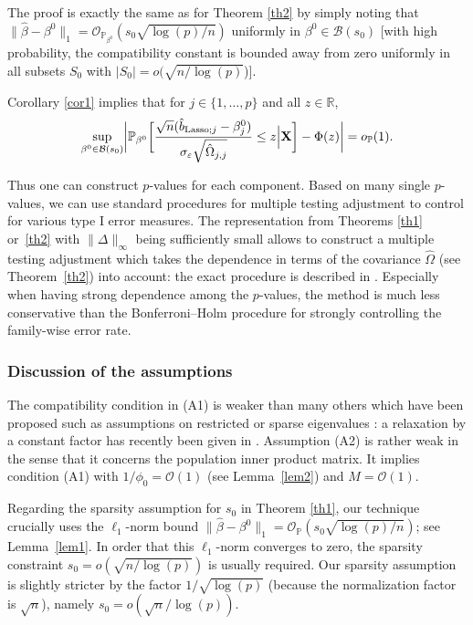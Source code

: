 \documentclass[aos,MSNbibl,dvips]{arximspdf}
\newcommand{\rrvert}{\vert}
\newcommand{\llvert}{\vert}
\def\cal{\mathcal}
\newcommand{\PP}{\mathbb{P}}
\newcommand{\R}{\mathbb{R}}
\newcommand{\eps}{\varepsilon}
\newcommand{\bx}{\mathbf{X}}
\begin{document}
The proof is exactly the same as for Theorem \ref{th2} by simply noting
that $ \|\hat{\beta} - \beta^0\|_1 =
{\mathcal O}_{\PP_{\beta^0} }(s_{0} \sqrt{\log(p)/n})$ uniformly in
$\beta^0 \in{\cal B} (s_0)$ [with high probability, the compatibility
constant is bounded away from zero uniformly in all subsets $S_0$ with
$|S_0 | =o(\sqrt{n /\log(p)}$)].

Corollary \ref{cor1} implies that for $j \in\{1,\ldots,p\}$ and all
$z \in\R$,
%
\[
\sup_{\beta^0 \in{\cal B}(s_0 )}\biggl\llvert \PP_{\beta^0} \biggl[
{
\sqrt
{n}(\hat{b}_{\mathrm{Lasso};j} -
\beta_{j}^0) \over\sigma_{\eps} \sqrt{\hat\Omega_{j,j}}} \le z \Big|\bx \biggr] - \Phi(z) \biggr\rrvert =
o_{\PP} (1).
\]
%

Thus one can construct $p$-values for each component.
Based on many single $p$-values, we can use standard procedures for multiple
testing adjustment to control for various type I error measures. The
representation from Theorems \ref{th1} or~\ref{th2} with
$\|\Delta\|_{\infty}$ being sufficiently small allows to construct a
multiple testing adjustment which takes the dependence in terms of the
covariance $\hat\Omega$ (see Theorem~\ref{th2}) into account: the exact
procedure is described in \cite{pb12}. Especially when having strong
dependence among the $p$-values, the method is much less conservative than
the Bonferroni--Holm procedure for strongly controlling the family-wise error
rate.

\subsubsection{Discussion of the assumptions}\label{subsecass}

The compatibility condition in (A1) is weaker than many others which
have been proposed such as assumptions on restricted or sparse eigenvalues
\cite{van2009conditions}: a relaxation by a constant factor has
recently been given in \cite{sunzhang11}.
Assumption (A2) is rather weak in the sense that it
concerns the population inner product matrix. It implies condition (A1) with
$1/\phi_0={\mathcal O} (1)$ (see Lemma~\ref{lem2}) and $M = {\mathcal O} (1)$.

Regarding the sparsity assumption for $s_{0}$ in Theorem \ref{th1}, our
technique
crucially uses the $\ell_1$-norm bound $\|\hat{\beta} - \beta^0\|_1 =
{\mathcal O}_{\PP}(s_{0} \sqrt{\log(p)/n})$; see Lem\-ma~\ref{lem1}. In
order that this
$\ell_1$-norm converges to zero, the sparsity constraint
$s_{0} = o(\sqrt{n/\log(p)})$ is usually required. Our sparsity
assumption is slightly stricter by the factor $1/ \sqrt{\log(p)}$
(because the
normalization factor is $\sqrt{n}$), namely
$s_{0} = o(\sqrt n / \log(p))$.
\end{document}
